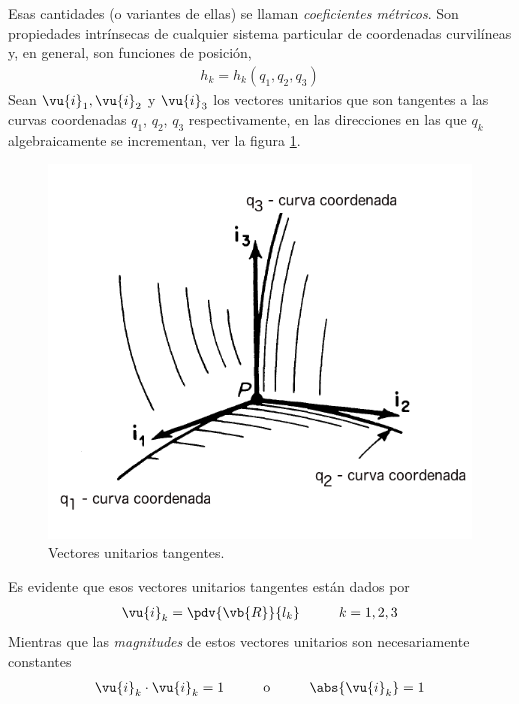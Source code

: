Esas cantidades (o variantes de ellas) se llaman \emph{coeficientes métricos}. Son propiedades intrínsecas de cualquier sistema particular de coordenadas curvilíneas y, en general, son funciones de posición,
\begin{align*}
h_{k} = h_{k} (q_{1}, q_{2}, q_{3})
\end{align*}
Sean $\vu{i}_{1}, \vu{i}_{2}$ y $\vu{i}_{3}$ los vectores unitarios que son tangentes a las curvas coordenadas $q_{1}$, $q_{2}$, $q_{3}$ respectivamente, en las direcciones en las que $q_{k}$ algebraicamente se incrementan, ver la figura \ref{fig:figura_A_02}.
\begin{figure}[H]
    \centering
    \includegraphics[scale=0.4]{Imagenes/CoordenadasCurvilineas_02.png}
    \caption{Vectores unitarios tangentes.}
    \label{fig:figura_A_02}
\end{figure}
Es evidente que esos vectores unitarios tangentes están dados por
\begin{align}
\vu{i}_{k} = \pdv{\vb{R}}{l_{k}} \hspace{1cm} k = 1, 2, 3
\label{eq:ecuacion_A_01_05}    
\end{align}
Mientras que las \emph{magnitudes} de estos vectores unitarios son necesariamente constantes
\begin{align}
\vu{i}_{k} \cdot \vu{i}_{k} =  1 \hspace{1cm} \mbox{o} \hspace{1cm} \abs{\vu{i}_{k}} = 1
\label{eq:ecuacion_A_01_06}
\end{align}
